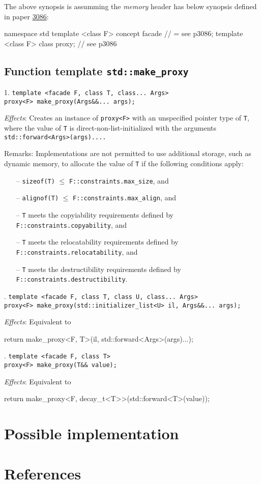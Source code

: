 \documentclass[10pt, a4paper, oneside]{article}
\begin{document}
\noindent The above synopsis is assumming the \textit{memory} header has below synopsis defined in paper \href{https://wg21.link/p3086}{3086}:
\begin{codeblock}
namespace std {
  template <class F>
    concept facade // = see p3086;
  template <class F>
    class proxy; // see p3086
}

\end{codeblock}

\subsection{Function template \texttt{std::make\_proxy}}
1. \verb|template <facade F, class T, class... Args>|\\
\indent \verb|proxy<F> make_proxy(Args&&... args);|

\textit{Effects}: Creates an instance of \verb|proxy<F>| with an unspecified pointer type of \verb|T|,
where the value of \verb|T| is direct-non-list-initialized with the arguments \verb|std::forward<Args>(args)....|

Remarks: Implementations are not permitted to use additional storage, such as dynamic memory, to
allocate the value of \verb|T| if the following conditions apply:
\begin{itemize}
  \item[--] \verb|sizeof(T)| $\le$ \verb|F::constraints.max_size|, and
  \item[--] \verb|alignof(T)| $\le$ \verb|F::constraints.max_align|, and
  \item[--] \verb|T| meets the copyiability requirements defined by \verb|F::constraints.copyability|, and
  \item[--] \verb|T| meets the relocatability requirements defined by \verb|F::constraints.relocatability|, and
  \item[--] \verb|T| meets the destructibility requirements defined by \verb|F::constraints.destructibility|.
\end{itemize}

. \verb|template <facade F, class T, class U, class... Args>|\\
\indent \verb|proxy<F> make_proxy(std::initializer_list<U> il, Args&&... args);|

\textit{Effects}: Equivalent to
\begin{codeblock}
  return make_proxy<F, T>(il, std::forward<Args>(args)...);
\end{codeblock}

. \verb|template <facade F, class T>|\\
\indent \verb|proxy<F> make_proxy(T&& value);|

\textit{Effects}: Equivalent to
\begin{codeblock}
  return make_proxy<F, decay_t<T>>(std::forward<T>(value));
\end{codeblock}

\section{Possible implementation}

\section{References}
\end{document}
